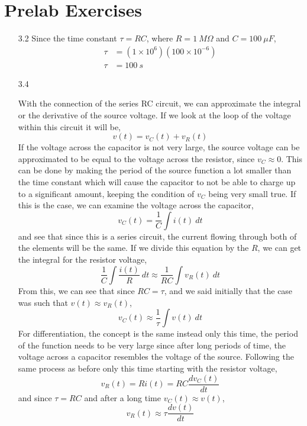 \documentclass[12pt]{article}
\begin{document}
    \section*{Prelab Exercises}
    \begin{itemize}
        \item[3.2]
            Since the time constant $\tau=RC$, where $R=1\ M\Omega$ and $C=100\ \mu F$,
            \begin{align*}
                \tau &= (1 \times 10^{6})(100 \times 10^{-6}) \\
                \tau &= \boxed{100\ s}
            \end{align*}
        \item[3.4]
            \par With the connection of the series RC circuit, we can approximate the integral or the derivative of the source voltage.  If we look at the loop of the voltage within this circuit it will be,
            \[
                v(t) = v_C(t) + v_R(t)
            \]
            If the voltage across the capacitor is not very large, the source voltage can be approximated to be equal to the voltage across the resistor, since $v_C \approx 0$. This can be done by making the period of the source function a lot smaller than the time constant which will cause the capacitor to not be able to charge up to a significant amount, keeping the condition of $v_C$ being very small true. If this is the case, we can examine the voltage across the capacitor,
            \[
                v_C(t) = \frac{1}{C} \int i(t)\ dt
            \]
            and see that since this is a series circuit, the current flowing through both of the elements will be the same. If we divide this equation by the $R$, we can get the integral for the resistor voltage,
            \[
                \frac{1}{C} \int \frac{i(t)}{R}\ dt \approx \frac{1}{RC} \int v_R(t)\ dt
            \]
            From this, we can see that since $RC = \tau$, and we said initially that the case was such that $v(t) \approx v_R(t)$,
            \[
                v_C(t) \approx \frac{1}{\tau} \int v(t)\ dt
            \]
            For differentiation, the concept is the same instead only this time, the period of the function needs to be very large since after long periods of time, the voltage across a capacitor resembles the voltage of the source. Following the same process as before only this time starting with the resistor voltage,
            \[
                v_R(t) = R i(t) = R C \frac{d v_C(t)}{dt}
            \]
            and since $\tau = RC$ and after a long time $v_C(t) \approx v(t)$,
            \[
                v_R(t) \approx \tau \frac{d v(t)}{dt}
            \]
    \end{itemize}
    \newpage
\end{document}
